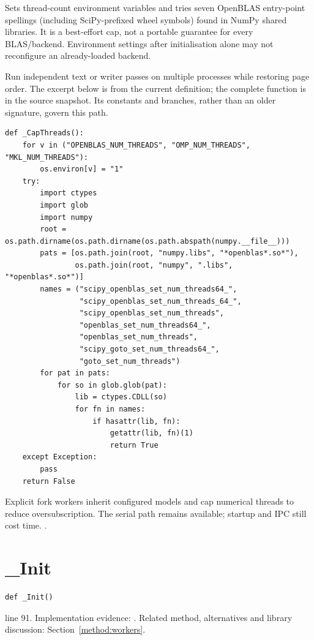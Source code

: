 Sets thread-count environment variables and tries seven OpenBLAS entry-point spellings (including SciPy-prefixed wheel symbols) found in NumPy shared libraries. It is a best-effort cap, not a portable guarantee for every BLAS/backend. Environment settings after initialisation alone may not reconfigure an already-loaded backend.


Run independent text or writer passes on multiple processes while restoring page order. The excerpt below is from the current definition; the complete function is in the source snapshot. Its constants and branches, rather than an older signature, govern this path.


\begin{lstlisting}[style=plain]
def _CapThreads():
    for v in ("OPENBLAS_NUM_THREADS", "OMP_NUM_THREADS", "MKL_NUM_THREADS"):
        os.environ[v] = "1"
    try:
        import ctypes
        import glob
        import numpy
        root = os.path.dirname(os.path.dirname(os.path.abspath(numpy.__file__)))
        pats = [os.path.join(root, "numpy.libs", "*openblas*.so*"),
                os.path.join(root, "numpy", ".libs", "*openblas*.so*")]
        names = ("scipy_openblas_set_num_threads64_",
                 "scipy_openblas_set_num_threads_64_",
                 "scipy_openblas_set_num_threads",
                 "openblas_set_num_threads64_",
                 "openblas_set_num_threads",
                 "scipy_goto_set_num_threads64_",
                 "goto_set_num_threads")
        for pat in pats:
            for so in glob.glob(pat):
                lib = ctypes.CDLL(so)
                for fn in names:
                    if hasattr(lib, fn):
                        getattr(lib, fn)(1)
                        return True
    except Exception:
        pass
    return False
\end{lstlisting}
Explicit fork workers inherit configured models and cap numerical threads to reduce oversubscription. The serial path remains available; startup and IPC still cost time. \cite{pythonmp,numpymatmul}.


\section{\_Init}\label{fn:web-lineworkers:-Init}
\begin{lstlisting}[style=sig]
def _Init()
\end{lstlisting}
 line 91. Implementation evidence: \cite{code2026}. Related method, alternatives and library discussion: Section~\ref{method:workers}.


